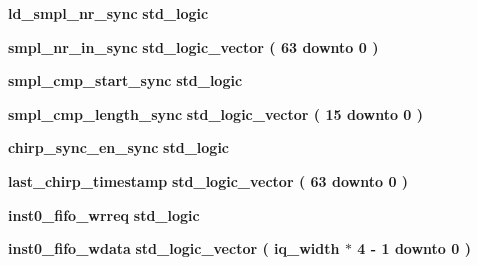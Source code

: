 \begin{DoxyCompactItemize}
\item 
{\bf ld\+\_\+smpl\+\_\+nr\+\_\+sync} {\bfseries \textcolor{comment}{std\+\_\+logic}\textcolor{vhdlchar}{ }} 
\item 
{\bf smpl\+\_\+nr\+\_\+in\+\_\+sync} {\bfseries \textcolor{comment}{std\+\_\+logic\+\_\+vector}\textcolor{vhdlchar}{ }\textcolor{vhdlchar}{(}\textcolor{vhdlchar}{ }\textcolor{vhdlchar}{ } \textcolor{vhdldigit}{63} \textcolor{vhdlchar}{ }\textcolor{keywordflow}{downto}\textcolor{vhdlchar}{ }\textcolor{vhdlchar}{ } \textcolor{vhdldigit}{0} \textcolor{vhdlchar}{ }\textcolor{vhdlchar}{)}\textcolor{vhdlchar}{ }} 
\item 
{\bf smpl\+\_\+cmp\+\_\+start\+\_\+sync} {\bfseries \textcolor{comment}{std\+\_\+logic}\textcolor{vhdlchar}{ }} 
\item 
{\bf smpl\+\_\+cmp\+\_\+length\+\_\+sync} {\bfseries \textcolor{comment}{std\+\_\+logic\+\_\+vector}\textcolor{vhdlchar}{ }\textcolor{vhdlchar}{(}\textcolor{vhdlchar}{ }\textcolor{vhdlchar}{ } \textcolor{vhdldigit}{15} \textcolor{vhdlchar}{ }\textcolor{keywordflow}{downto}\textcolor{vhdlchar}{ }\textcolor{vhdlchar}{ } \textcolor{vhdldigit}{0} \textcolor{vhdlchar}{ }\textcolor{vhdlchar}{)}\textcolor{vhdlchar}{ }} 
\item 
{\bf chirp\+\_\+sync\+\_\+en\+\_\+sync} {\bfseries \textcolor{comment}{std\+\_\+logic}\textcolor{vhdlchar}{ }} 
\item 
{\bf last\+\_\+chirp\+\_\+timestamp} {\bfseries \textcolor{comment}{std\+\_\+logic\+\_\+vector}\textcolor{vhdlchar}{ }\textcolor{vhdlchar}{(}\textcolor{vhdlchar}{ }\textcolor{vhdlchar}{ } \textcolor{vhdldigit}{63} \textcolor{vhdlchar}{ }\textcolor{keywordflow}{downto}\textcolor{vhdlchar}{ }\textcolor{vhdlchar}{ } \textcolor{vhdldigit}{0} \textcolor{vhdlchar}{ }\textcolor{vhdlchar}{)}\textcolor{vhdlchar}{ }} 
\item 
{\bf inst0\+\_\+fifo\+\_\+wrreq} {\bfseries \textcolor{comment}{std\+\_\+logic}\textcolor{vhdlchar}{ }} 
\item 
{\bf inst0\+\_\+fifo\+\_\+wdata} {\bfseries \textcolor{comment}{std\+\_\+logic\+\_\+vector}\textcolor{vhdlchar}{ }\textcolor{vhdlchar}{(}\textcolor{vhdlchar}{ }\textcolor{vhdlchar}{ }\textcolor{vhdlchar}{ }\textcolor{vhdlchar}{ }{\bfseries {\bf iq\+\_\+width}} \textcolor{vhdlchar}{$\ast$}\textcolor{vhdlchar}{ } \textcolor{vhdldigit}{4} \textcolor{vhdlchar}{-\/}\textcolor{vhdlchar}{ } \textcolor{vhdldigit}{1} \textcolor{vhdlchar}{ }\textcolor{keywordflow}{downto}\textcolor{vhdlchar}{ }\textcolor{vhdlchar}{ } \textcolor{vhdldigit}{0} \textcolor{vhdlchar}{ }\textcolor{vhdlchar}{)}\textcolor{vhdlchar}{ }} 

\end{DoxyCompactItemize}
